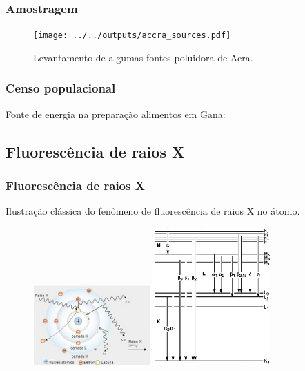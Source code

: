 \begin{frame}
  \frametitle{Amostragem}
  \begin{figure}[H]
  \centering	
  \texttt{[image: ../../outputs/accra\_sources.pdf]}
  \caption{Levantamento de algumas fontes poluidora de Acra.
           \label{fg:acrasources}}
 \end{figure}
\end{frame}

\begin{frame}
  \frametitle{Censo populacional}
\begin{center}
  Fonte de energia na preparação alimentos em Gana:
\end{center}
  \begin{table}[H]
  	\centering
  	
  \end{table}
\end{frame}

\subsection{Fluorescência de raios X}
\begin{frame}
  \frametitle{Fluorescência de raios X}
  Ilustração clássica do fenômeno de fluorescência de raios X no átomo.
  \begin{figure}[H]
    \centering
    \includegraphics[width=0.4\textwidth]{../../inputs/images/shimadzu_atomo.jpg}
    \hspace{1cm}
    \includegraphics[width=0.4\textwidth]{../../inputs/images/Siegbahn.jpg}
  \end{figure}
\end{frame}


